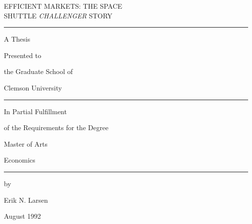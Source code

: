 \thispagestyle{empty}
\begin{center}
        \vspace*{1in plus 1pt minus 1pt}
        \uppercase{Efficient Markets:  The Space\\
        Shuttle {\em Challenger} Story}\par
        \smallskip
        \rule{2in}{.2mm}\par
        \smallskip
        A Thesis\par
        Presented to\par
        the Graduate School of\par
        Clemson University\par
        \smallskip
        \rule{2in}{.2mm}\par
        \smallskip
        In Partial Fulfillment\par
        of the Requirements for the Degree\par
        Master of Arts\par
        Economics\par
        \smallskip
        \rule{2in}{.2mm}\par
        \smallskip
        by\par
        Erik N. Larsen\par
        August 1992\par
        \bigskip
\end{center}
